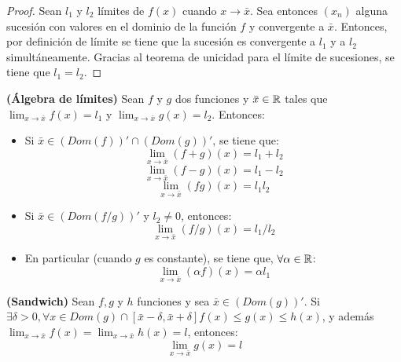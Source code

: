 \begin{proof}
	Sean $l_1$ y $l_2$ límites de $f(x)$ cuando $x\rightarrow \bar{x}$. Sea entonces $(x_n)$ alguna sucesión con valores en el dominio de la función $f$ y convergente a $\bar{x}$. Entonces, por definición de límite se tiene que la sucesión es convergente a $l_1$ y a $l_2$ simultáneamente. Gracias al teorema de unicidad para el límite de sucesiones, se tiene que $l_1 = l_2$. 
\end{proof}

\begin{teorema}
	\textbf{(Álgebra de límites)}
	Sean $f$ y $g$ dos funciones y $\bar{x}\in \mathbb{R}$ tales que $ \lim_{x\rightarrow\bar{x}} f(x) = l_1$ y $\lim_{x\rightarrow\bar{x}}g(x) = l_2$. Entonces: 
	\begin{itemize}
		\item Si $\bar{x} \in (Dom(f))' \cap (Dom(g))'$, se tiene que: 
		$$ \lim_{x\rightarrow\bar{x}}(f+g)(x) = l_1 + l_2 $$ 
		$$ \lim_{x\rightarrow\bar{x}}(f-g)(x) = l_1 - l_2 $$ 
		$$ \lim_{x\rightarrow\bar{x}}(fg)(x) = l_1  l_2 $$ 
		\item Si $\bar{x} \in (Dom(f/g))'$ y $l_2 \neq 0$, entonces: 
		$$ \lim_{x\rightarrow\bar{x}} (f/g)(x) = l_1/l_2 $$ 
		\item En particular (cuando $g$ es constante), se tiene que, $\forall \alpha \in \mathbb{R}$: 
		$$ \lim_{x\rightarrow\bar{x}} (\alpha f ) (x) = \alpha l_1 $$ 
	\end{itemize}
\end{teorema}

\begin{teorema}
	\textbf{(Sandwich)}
	Sean $f, g$ y $h$ funciones y sea $\bar{x} \in (Dom(g))'$. 
	Si $\exists \delta > 0, \forall x \in Dom(g) \cap [\bar{x} - \delta , \bar{x} + \delta ] f(x) \leq g(x) \leq h(x) $, y además $\lim_{x\rightarrow\bar{x}} f(x) = \lim_{x\rightarrow\bar{x}} h(x) = l$, entonces: 
	$$ \lim_{x\rightarrow\bar{x}} g(x) = l $$ 
\end{teorema}
